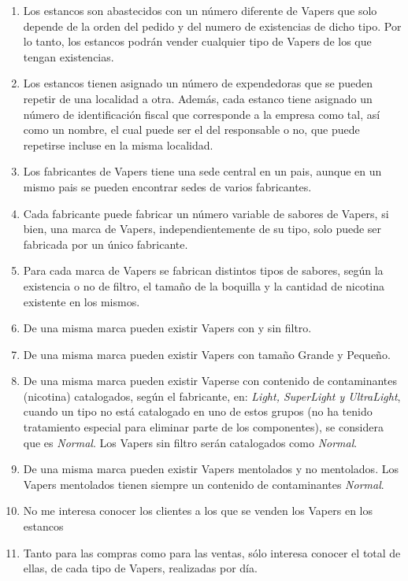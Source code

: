 \documentclass{article}
\begin{document}
\begin{enumerate}
  
  \item Los estancos son abastecidos con un número diferente de Vapers que solo depende de la orden del pedido y del numero de existencias de dicho tipo. Por lo tanto, los 
  estancos podrán vender cualquier tipo de Vapers de los que tengan existencias.
  
  \item Los estancos tienen asignado un número de expendedoras que se pueden repetir de una localidad a otra. Además, cada estanco tiene asignado un número de identificación 
  fiscal que corresponde a la empresa como tal, así como un nombre, el cual puede ser el del responsable o no, que puede repetirse incluse en la misma localidad.
  
  \item Los fabricantes de Vapers tiene una sede central en un pais, aunque en un mismo pais se pueden encontrar sedes de varios fabricantes.
  
  \item Cada fabricante puede fabricar un número variable de sabores de Vapers, si bien, una marca de Vapers, independientemente de su tipo, solo puede ser fabricada
  por un único fabricante.

  \item Para cada marca de Vapers se fabrican distintos tipos de sabores, según la existencia o no de filtro, el tamaño de la boquilla y la cantidad de nicotina existente en los mismos.

  \item De una misma marca pueden existir Vapers con y sin filtro.
  
  \item De una misma marca pueden existir Vapers con tamaño Grande y Pequeño. 
  
  \item De una misma marca pueden existir Vaperse con contenido de contaminantes (nicotina) catalogados, según el fabricante, en: \textit{Light, SuperLight y UltraLight},
  cuando un tipo no está catalogado en uno de estos grupos (no ha tenido tratamiento especial para eliminar parte de los componentes), se considera que es \textit{Normal}. Los Vapers
  sin filtro serán catalogados como \textit{Normal}.

  \item De una misma marca pueden existir Vapers mentolados y no mentolados. Los Vapers mentolados tienen siempre un contenido de contaminantes \textit{Normal}.
  
  \item No me interesa conocer los clientes a los que se venden los Vapers en los estancos
  
  \item Tanto para las compras como para las ventas, sólo interesa conocer el total de ellas, de cada tipo de Vapers, realizadas por día.  

\end{enumerate}
\end{document}
